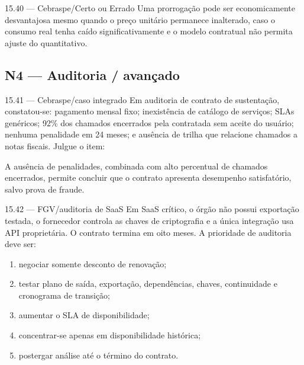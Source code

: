 \begin{questao}{ 15.40 — Cebraspe/Certo ou Errado}
Uma prorrogação pode ser economicamente desvantajosa mesmo quando o preço unitário permanece inalterado, caso o consumo real tenha caído significativamente e o modelo contratual não permita ajuste do quantitativo.
\end{questao}

\subsection*{N4 — Auditoria / avançado}

\begin{questao}{ 15.41 — Cebraspe/caso integrado}
Em auditoria de contrato de sustentação, constatou-se: pagamento mensal fixo; inexistência de catálogo de serviços; SLAs genéricos; 92\% dos chamados encerrados pela contratada sem aceite do usuário; nenhuma penalidade em 24 meses; e ausência de trilha que relacione chamados a notas fiscais. Julgue o item:

A ausência de penalidades, combinada com alto percentual de chamados encerrados, permite concluir que o contrato apresenta desempenho satisfatório, salvo prova de fraude.
\end{questao}

\begin{questao}{ 15.42 — FGV/auditoria de SaaS}
Em SaaS crítico, o órgão não possui exportação testada, o fornecedor controla as chaves de criptografia e a única integração usa API proprietária. O contrato termina em oito meses. A prioridade de auditoria deve ser:
\begin{enumerate}[label=\Alph*)]
\item negociar somente desconto de renovação;
\item testar plano de saída, exportação, dependências, chaves, continuidade e cronograma de transição;
\item aumentar o SLA de disponibilidade;
\item concentrar-se apenas em disponibilidade histórica;
\item postergar análise até o término do contrato.
\end{enumerate}
\end{questao}

